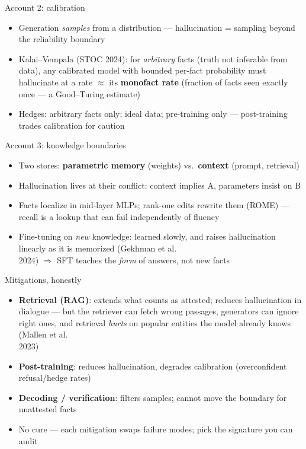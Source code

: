 \documentclass[aspectratio=169,11pt]{beamer}
\begin{document}
\begin{frame}{Account 2: calibration}
\begin{itemize}
\item Generation \emph{samples} from a distribution --- hallucination = sampling beyond the reliability boundary
\item Kalai--Vempala (STOC 2024): for \emph{arbitrary} facts (truth not inferable from data), any calibrated model with bounded per-fact probability must hallucinate at a rate $\approx$ its \textbf{monofact rate} (fraction of facts seen exactly once --- a Good--Turing estimate)
\item Hedges: arbitrary facts only; ideal data; pre-training only --- post-training trades calibration for caution
\end{itemize}
\end{frame}

\begin{frame}{Account 3: knowledge boundaries}
\begin{itemize}
\item Two stores: \textbf{parametric memory} (weights) vs.\ \textbf{context} (prompt, retrieval)
\item Hallucination lives at their conflict: context implies A, parameters insist on B
\item Facts localize in mid-layer MLPs; rank-one edits rewrite them (ROME) --- recall is a lookup that can fail independently of fluency
\item Fine-tuning on \emph{new} knowledge: learned slowly, and raises hallucination linearly as it is memorized (Gekhman et al.\\ 2024) $\Rightarrow$ SFT teaches the \emph{form} of answers, not new facts
\end{itemize}
\end{frame}

\begin{frame}{Mitigations, honestly}
\begin{itemize}
\item \textbf{Retrieval (RAG)}: extends what counts as attested; reduces hallucination in dialogue --- but the retriever can fetch wrong passages, generators can ignore right ones, and retrieval \emph{hurts} on popular entities the model already knows (Mallen et al.\\ 2023)
\item \textbf{Post-training}: reduces hallucination, degrades calibration (overconfident refusal/hedge rates)
\item \textbf{Decoding / verification}: filters samples; cannot move the boundary for unattested facts
\item No cure --- each mitigation swaps failure modes; pick the signature you can audit
\end{itemize}
\end{frame}
\end{document}
